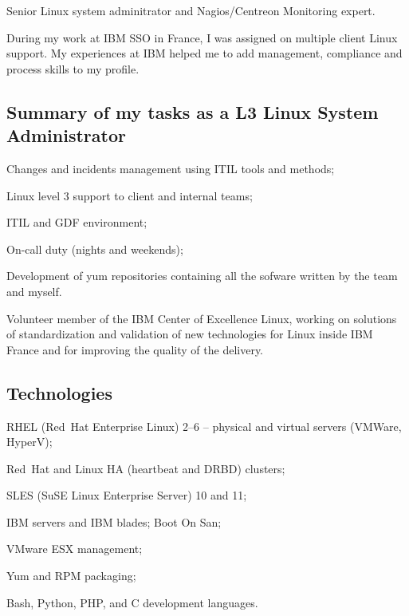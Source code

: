 

Senior Linux system adminitrator and Nagios/Centreon Monitoring expert.

During my work at IBM SSO in France, I was assigned on multiple client Linux support.
My experiences at IBM helped me to add management, compliance and process skills 
to my profile. 

\subsection{Summary of my tasks as a L3 Linux System Administrator}

\item{\bdot} Changes and incidents management using ITIL tools and methods;
\item{\bdot} Linux level 3 support to client and internal teams;
\item{\bdot} ITIL and GDF environment;
\item{\bdot} On-call duty (nights and weekends);
\item{\bdot} Development of yum repositories containing all the sofware 
   written by the team and myself.

\smallskip\noindent
Volunteer member of the IBM Center of Excellence Linux, working on solutions of 
standardization and validation of new technologies for Linux inside IBM France and
for improving the quality of the delivery.

\subsection{Technologies}

\item{\bdot} RHEL (Red~Hat Enterprise Linux) 2--6 -- physical and virtual
   servers (VMWare, HyperV);
\item{\bdot} Red~Hat and Linux HA (heartbeat and DRBD) clusters;
\item{\bdot} SLES (SuSE Linux Enterprise Server) 10 and 11;
\item{\bdot} IBM servers and IBM blades; Boot On San;
\item{\bdot} VMware ESX management;
\item{\bdot} Yum and RPM packaging;
\item{\bdot} Bash, Python, PHP, and C development languages.

